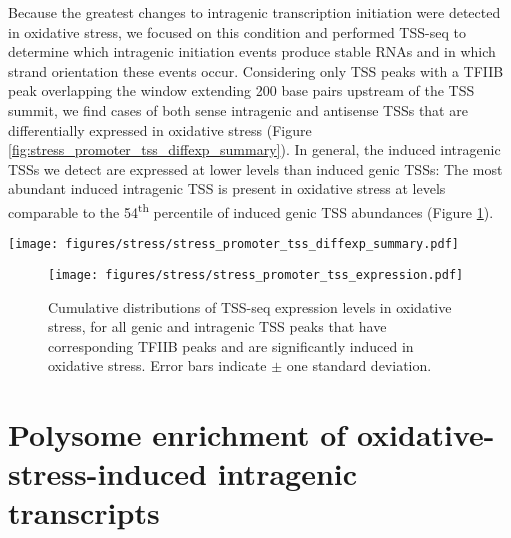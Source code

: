 Because the greatest changes to intragenic transcription initiation were detected in oxidative stress, we focused on this condition and performed TSS-seq to determine which intragenic initiation events produce stable RNAs and in which strand orientation these events occur.
Considering only TSS peaks with a TFIIB peak overlapping the window extending 200 base pairs upstream of the TSS summit, we find cases of both sense intragenic and antisense TSSs that are differentially expressed in oxidative stress (Figure \ref{fig:stress_promoter_tss_diffexp_summary}).
In general, the induced intragenic TSSs we detect are expressed at lower levels than induced genic TSSs: The most abundant induced intragenic TSS is present in oxidative stress at levels comparable to the 54\textsuperscript{th} percentile of induced genic TSS abundances (Figure \ref{fig:stress_promoter_tss_expression}).

\begin{SCfigure}[50][h]
    \texttt{[image: figures/stress/stress\_promoter\_tss\_diffexp\_summary.pdf]}
    \caption[Bar plot of the number of promoters in various genomic classes detected as differentially expressed in oxidative stress.]{Bar plot of the number of TSS peaks in various genomic classes that have corresponding TFIIB peaks and are detected as differentially expressed in oxidative stress.}
    \label{fig:stress_promoter_tss_diffexp_summary}
\end{SCfigure}

\begin{figure}[h]
    \texttt{[image: figures/stress/stress\_promoter\_tss\_expression.pdf]}
    \caption[TSS-seq expression levels in oxidative stress of oxidative-stress-induced genic and intragenic promoters.]{Cumulative distributions of TSS-seq expression levels in oxidative stress, for all genic and intragenic TSS peaks that have corresponding TFIIB peaks and are significantly induced in oxidative stress. Error bars indicate $\pm$ one standard deviation.}
    \label{fig:stress_promoter_tss_expression}
\end{figure}

\clearpage

\section{Polysome enrichment of oxidative-stress-induced intragenic transcripts}

